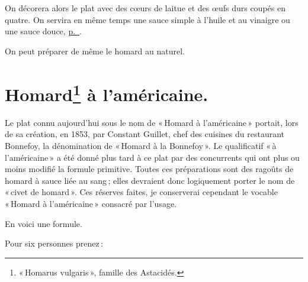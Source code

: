 On décorera alors le plat avec des cœurs de laitue et des œufs durs coupés en
quatre. On servira en même temps une sauce simple à l'huile et au vinaigre ou
une sauce douce, \hyperlink{p0415}{p. \pageref{pg0415}}.

\sk

On peut préparer de même le homard au naturel.

\section*{\centering Homard\footnote{« Homarus vulgaris », famille des Astacidés.} à l'américaine.}

Le plat connu aujourd'hui sous le nom de « Homard à l'américaine » portait,
lors de sa création, en 1853, par Constant Guillet, chef des cuisines du
restaurant Bonnefoy, la dénomination de « Homard à la Bonnefoy ». Le
qualificatif « à l'américaine » a été donné plus tard à ce plat par des
concurrents qui ont plus ou moins modifié la formule primitive. Toutes ces
préparations sont des ragoûts de homard à sauce liée au sang ; elles devraient
donc logiquement porter le nom de « civet de homard ». Ces réserves faites, je
conserverai cependant le vocable « Homard à l'américaine » consacré par
l'usage.

En voici une formule.

\medskip

Pour six personnes prenez :

\medskip

